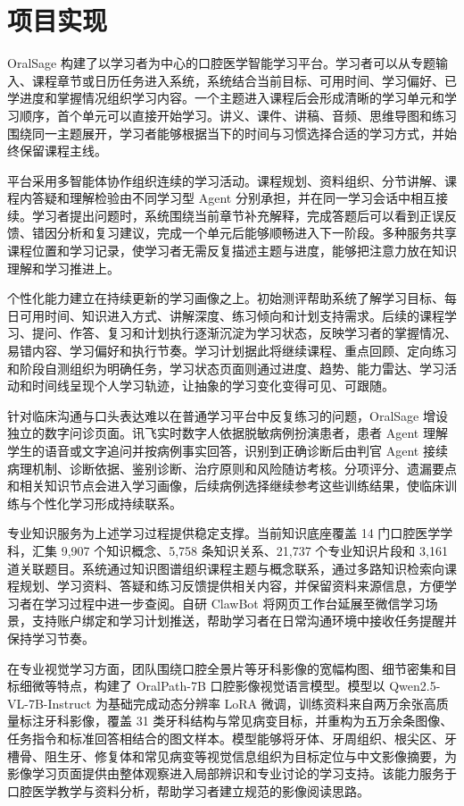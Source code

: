 \section{项目实现}

OralSage 构建了以学习者为中心的口腔医学智能学习平台。学习者可以从专题输入、课程章节或日历任务进入系统，系统结合当前目标、可用时间、学习偏好、已学进度和掌握情况组织学习内容。一个主题进入课程后会形成清晰的学习单元和学习顺序，首个单元可以直接开始学习。讲义、课件、讲稿、音频、思维导图和练习围绕同一主题展开，学习者能够根据当下的时间与习惯选择合适的学习方式，并始终保留课程主线。

平台采用多智能体协作组织连续的学习活动。课程规划、资料组织、分节讲解、课程内答疑和理解检验由不同学习型 Agent 分别承担，并在同一学习会话中相互接续。学习者提出问题时，系统围绕当前章节补充解释，完成答题后可以看到正误反馈、错因分析和复习建议，完成一个单元后能够顺畅进入下一阶段。多种服务共享课程位置和学习记录，使学习者无需反复描述主题与进度，能够把注意力放在知识理解和学习推进上。

个性化能力建立在持续更新的学习画像之上。初始测评帮助系统了解学习目标、每日可用时间、知识进入方式、讲解深度、练习倾向和计划支持需求。后续的课程学习、提问、作答、复习和计划执行逐渐沉淀为学习状态，反映学习者的掌握情况、易错内容、学习偏好和执行节奏。学习计划据此将继续课程、重点回顾、定向练习和阶段自测组织为明确任务，学习状态页面则通过进度、趋势、能力雷达、学习活动和时间线呈现个人学习轨迹，让抽象的学习变化变得可见、可跟随。

针对临床沟通与口头表达难以在普通学习平台中反复练习的问题，OralSage 增设独立的数字问诊页面。讯飞实时数字人依据脱敏病例扮演患者，患者 Agent 理解学生的语音或文字追问并按病例事实回答，识别到正确诊断后由判官 Agent 接续病理机制、诊断依据、鉴别诊断、治疗原则和风险随访考核。分项评分、遗漏要点和相关知识节点会进入学习画像，后续病例选择继续参考这些训练结果，使临床训练与个性化学习形成持续联系。

专业知识服务为上述学习过程提供稳定支撑。当前知识底座覆盖 14 门口腔医学学科，汇集 9,907 个知识概念、5,758 条知识关系、21,737 个专业知识片段和 3,161 道关联题目。系统通过知识图谱组织课程主题与概念联系，通过多路知识检索向课程规划、学习资料、答疑和练习反馈提供相关内容，并保留资料来源信息，方便学习者在学习过程中进一步查阅。自研 ClawBot 将网页工作台延展至微信学习场景，支持账户绑定和学习计划推送，帮助学习者在日常沟通环境中接收任务提醒并保持学习节奏。

在专业视觉学习方面，团队围绕口腔全景片等牙科影像的宽幅构图、细节密集和目标细微等特点，构建了 OralPath-7B 口腔影像视觉语言模型。模型以 Qwen2.5-VL-7B-Instruct 为基础完成动态分辨率 LoRA 微调，训练资料来自两万余张高质量标注牙科影像，覆盖 31 类牙科结构与常见病变目标，并重构为五万余条图像、任务指令和标准回答相结合的图文样本。模型能够将牙体、牙周组织、根尖区、牙槽骨、阻生牙、修复体和常见病变等视觉信息组织为目标定位与中文影像摘要，为影像学习页面提供由整体观察进入局部辨识和专业讨论的学习支持。该能力服务于口腔医学教学与资料分析，帮助学习者建立规范的影像阅读思路。

